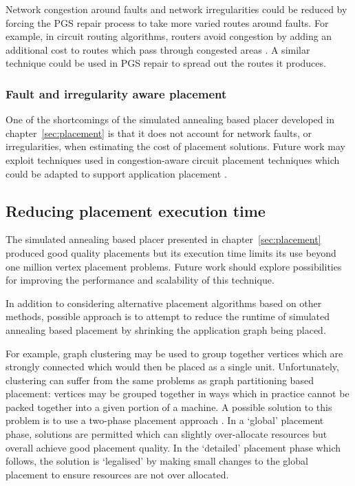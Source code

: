 				\label{sec:pgs-repair-improvements}	
				
				Network congestion around faults and network irregularities could be
				reduced by forcing the PGS repair process to take more varied routes
				around faults. For example, in circuit routing algorithms, routers
				avoid congestion by adding an additional cost to routes which pass
				through congested areas \cite{kahng11}. A similar technique could be
				used in PGS repair to spread out the routes it produces.
			
			\subsubsection{Fault and irregularity aware placement}
				
				One of the shortcomings of the simulated annealing based placer
				developed in chapter~\ref{sec:placement} is that it does not account
				for network faults, or irregularities, when estimating the cost of
				placement solutions.  Future work may exploit techniques used in
				congestion-aware circuit placement techniques which could be adapted to
				support application placement \cite{viswanathan07}.
		
		\subsection{Reducing placement execution time}
			
			The simulated annealing based placer presented in
			chapter~\ref{sec:placement} produced good quality placements but its
			execution time limits its use beyond one million vertex placement
			problems. Future work should explore possibilities for improving the
			performance and scalability of this technique.
			
			In addition to considering alternative placement algorithms based on
			other methods, possible approach is to attempt to reduce the runtime of
			simulated annealing based placement by shrinking the application graph
			being placed.
			
			For example, graph clustering \cite{schaeffer07} may be used to group
			together vertices which are strongly connected which would then be placed
			as a single unit.  Unfortunately, clustering can suffer from the same
			problems as graph partitioning based placement: vertices may be grouped
			together in ways which in practice cannot be packed together into a given
			portion of a machine.  A possible solution to this problem is to use a
			two-phase placement approach \cite{kahng11}. In a `global' placement
			phase, solutions are permitted which can slightly over-allocate resources
			but overall achieve good placement quality. In the `detailed' placement
			phase which follows, the solution is `legalised' by making small changes
			to the global placement to ensure resources are not over allocated.
			

